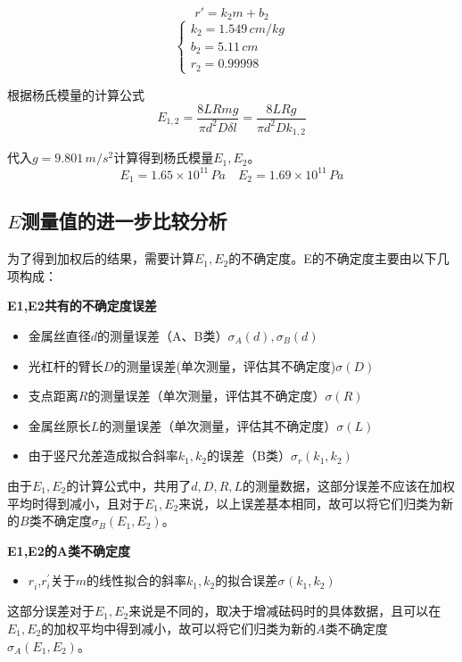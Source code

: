 \documentclass[12pt]{article}
\begin{document}
\begin{minipage}{0.5\textwidth}
\[
    r'=k_2m+b_2
\]
\begin{equation*}
\begin{cases}
    k_2=1.549\, cm/kg \\
    b_2=5.11\,cm \\
    r_2=0.99998
\end{cases}
\end{equation*}
\end{minipage}
\vspace{1em}
\par
根据杨氏模量的计算公式\\
\[
E_{1,2}=\frac{8LRmg}{\pi d^2D\delta l}=\frac {8LRg}{\pi d^2D k_{1,2}}
\]
\par
代入$g=9.801\,m/s^2$计算得到杨氏模量$E_1,E_2$。\\
\[
E_1=1.65\times 10^{11}\,Pa \quad E_2=1.69\times 10^{11}\,Pa
\]

\subsection{$E$测量值的进一步比较分析}
\quad 为了得到加权后的结果，需要计算$E_1,E_2$的不确定度。E的不确定度主要由以下几项构成：\\
\par 
\textbf{E1,E2共有的不确定度误差}
\begin{itemize}
    \item 金属丝直径$d$的测量误差（A、B类）$\sigma_A(d),\sigma_B(d)$
    \item 光杠杆的臂长$D$的测量误差(单次测量，评估其不确定度)\;$\sigma(D)$
    \item 支点距离$R$的测量误差（单次测量，评估其不确定度）$\sigma(R)$
    \item 金属丝原长$L$的测量误差（单次测量，评估其不确定度）$\sigma(L)$
    \item 由于竖尺允差造成拟合斜率$k_1,k_2$的误差（B类）$\sigma_{r}(k_1,k_2)$
\end{itemize}
\quad 由于$E_1,E_2$的计算公式中，共用了$d,D,R,L$的测量数据，这部分误差不应该在加权平均时得到减小，且对于$E_1,E_2$来说，以上误差基本相同，故可以将它们归类为新的$B$类不确定度$\sigma_B(E_1,E_2)$。\\
\par 
\textbf{E1,E2的A类不确定度}
\begin{itemize}
    \item $r^{\ }_{i}$,$r^{'}_{i}$关于$m$的线性拟合的斜率$k_1,k_2$的拟合误差$\sigma_{}(k_1,k_2)$
\end{itemize}
\quad 这部分误差对于$E_1,E_2$来说是不同的，取决于增减砝码时的具体数据，且可以在$E_1,E_2$的加权平均中得到减小，故可以将它们归类为新的$A$类不确定度$\sigma_A(E_1,E_2)$。\\
\end{document}
